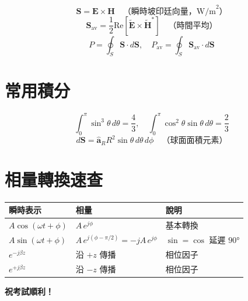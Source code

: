 \documentclass[12pt,a4paper]{article}
\newcommand{\vE}{\mathbf{E}}
\newcommand{\vH}{\mathbf{H}}
\newcommand{\vS}{\mathbf{S}}
\newcommand{\aR}{\hat{\mathbf{a}}_R}
\begin{document}
\begin{formulabox}[功率公式]
\[
  \vS = \vE \times \vH \quad \text{（瞬時坡印廷向量，W/m}^2\text{）}
\]
\[
  \vS_{\text{av}} = \frac{1}{2}\text{Re}[\tilde{\vE}\times\tilde{\vH}^*] \quad \text{（時間平均）}
\]
\[
  P = \oint_S \vS \cdot d\vS, \quad P_{\text{av}} = \oint_S \vS_{\text{av}} \cdot d\vS
\]
\end{formulabox}

\section{常用積分}

\begin{formulabox}[球座標積分]
\[
  \int_0^\pi \sin^3\theta\,d\theta = \frac{4}{3}, \quad
  \int_0^\pi \cos^2\theta\sin\theta\,d\theta = \frac{2}{3}
\]
\[
  d\vS = \aR R^2\sin\theta\,d\theta\,d\phi \quad \text{（球面面積元素）}
\]
\end{formulabox}

\section{相量轉換速查}

\begin{formulabox}[瞬時 $\leftrightarrow$ 相量]
\begin{center}
\begin{tabular}{lll}
\toprule
\textbf{瞬時表示} & \textbf{相量} & \textbf{說明} \\
\midrule
$A\cos(\omega t + \phi)$ & $A\,e^{j\phi}$ & 基本轉換 \\
$A\sin(\omega t + \phi)$ & $A\,e^{j(\phi - \pi/2)} = -jA\,e^{j\phi}$ & $\sin = \cos$ 延遲 $90°$ \\
$e^{-j\beta z}$ & 沿 $+z$ 傳播 & 相位因子 \\
$e^{+j\beta z}$ & 沿 $-z$ 傳播 & 相位因子 \\
\bottomrule
\end{tabular}
\end{center}
\end{formulabox}

\vfill
\begin{center}
\Large\bfseries 祝考試順利！
\end{center}
\end{document}
